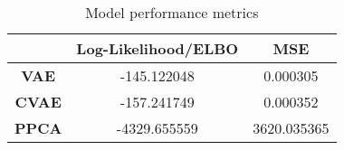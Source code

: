\begin{table}
\centering
\caption{Model performance metrics}
\label{table:metrics}
\begin{tabular}{ccc}
\toprule
{} &  \textbf{Log-Likelihood/ELBO} &  \textbf{MSE} \\
\midrule
\textbf{VAE } &                   -145.122048 &      0.000305 \\
\textbf{CVAE} &                   -157.241749 &      0.000352 \\
\textbf{PPCA} &                  -4329.655559 &   3620.035365 \\
\bottomrule
\end{tabular}
\end{table}
